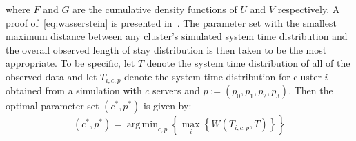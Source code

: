 \documentclass[11pt]{article}
\DeclareMathOperator*{\argmin}{arg\,min}
\begin{document}
\noindent where \(F\) and \(G\) are the cumulative density functions of \(U\)
and \(V\) respectively. A proof of~\eqref{eq:wasserstein} is presented
in~\cite{Ramdas2017}. The parameter set with the smallest maximum distance
between any cluster's simulated system time distribution and the overall
observed length of stay distribution is then taken to be the most appropriate.
To be specific, let \(T\) denote the system time distribution of all of the
observed data and let \(T_{i,c,p}\) denote the system time distribution for
cluster \(i\) obtained from a simulation with \(c\) servers and \(p :=
\left(p_0, p_1, p_2, p_3\right)\). Then the optimal parameter set \(\left(c^*,
p^*\right)\) is given by:
\begin{equation}\label{eq:parameters}
    \left(c^*, p^*\right) = \argmin_{c, p} \left\{%
        \max_{i} \left\{ W\left(T_{i,c,p}, T\right) \right\}%
    \right\}
\end{equation}
\end{document}
